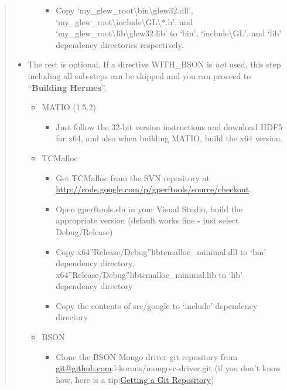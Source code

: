 \documentclass[a4paper,0pt,english]{sphinxmanual}
\begin{document}
\begin{quote}
\begin{itemize}
\begin{itemize}
\begin{itemize}
\item {} 
Copy `my\_glew\_root\textbackslash{}bin\textbackslash{}glew32.dll', `my\_glew\_root\textbackslash{}include\textbackslash{}GL\textbackslash{}*.h', and `my\_glew\_root\textbackslash{}lib\textbackslash{}glew32.lib' to `bin', `include\textbackslash{}GL', and `lib' dependency directories respectively.

\end{itemize}

\end{itemize}

\item {} 
The rest is optional. If a directive WITH\_BSON is \emph{not} used, this step including all sub-steps can be skipped and you can proceed to ``\textbf{Building Hermes}''.
\begin{itemize}
\item {} 
MATIO (1.5.2)
\begin{itemize}
\item {} 
Just follow the 32-bit version instructions and download HDF5 for x64, and also when building MATIO, build the x64 version.

\end{itemize}

\item {} 
TCMalloc
\begin{itemize}
\item {} 
Get TCMalloc from the SVN repository at \href{http://code.google.com/p/gperftools/source/checkout}{http://code.google.com/p/gperftools/source/checkout}.

\item {} 
Open gperftools.sln in your Visual Studio, build the appropriate version (default works fine - just select Debug/Release)

\item {} 
Copy x64''Release/Debug''libtcmalloc\_minimal.dll to `bin' dependency directory, x64''Release/Debug''libtcmalloc\_minimal.lib to `lib' dependency directory

\item {} 
Copy the contents of src/google to `include' dependency directory

\end{itemize}

\item {} 
BSON
\begin{itemize}
\item {} 
Clone the BSON Mongo driver git repository from \href{mailto:git@github.com}{git@github.com}:l-korous/mongo-c-driver.git (if you don't know how, here is a tip:\href{http://git-scm.com/book/en/Git-Basics-Getting-a-Git-Repository}{Getting a Git Repository})


\end{itemize}
\end{itemize}
\end{itemize}
\end{quote}
\end{document}
